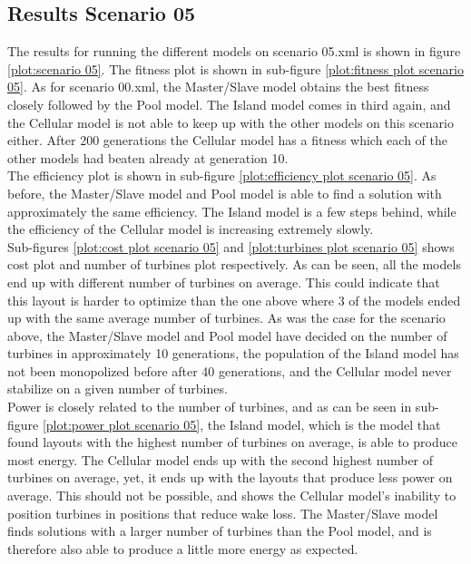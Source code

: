 \subsection{Results Scenario 05}
The results for running the different models on scenario 05.xml is shown in figure \ref{plot:scenario 05}. The fitness plot is shown in sub-figure \ref{plot:fitness plot scenario 05}. As for scenario 00.xml, the Master/Slave model obtains the best fitness closely followed by the Pool model. The Island model comes in third again, and the Cellular model is not able to keep up with the other models on this scenario either. After 200 generations the Cellular model has a fitness which each of the other models had beaten already at generation 10.\\

\noindent The efficiency plot is shown in sub-figure \ref{plot:efficiency plot scenario 05}. As before, the Master/Slave model and Pool model is able to find a solution with approximately the same efficiency. The Island model is a few steps behind, while the efficiency of the Cellular model is increasing extremely slowly. \\

\noindent Sub-figures \ref{plot:cost plot scenario 05} and \ref{plot:turbines plot scenario 05} shows cost plot and number of turbines plot respectively. As can be seen, all the models end up with different number of turbines on average. This could indicate that this layout is harder to optimize than the one above where 3 of the models ended up with the same average number of turbines. As was the case for the scenario above, the Master/Slave model and Pool model have decided on the number of turbines in approximately 10 generations, the population of the Island model has not been monopolized before after 40 generations, and the Cellular model never stabilize on a given number of turbines.\\

\noindent Power is closely related to the number of turbines, and as can be seen in sub-figure \ref{plot:power plot scenario 05}, the Island model, which is the model that found layouts with the highest number of turbines on average, is able to produce most energy. The Cellular model ends up with the second highest number of turbines on average, yet, it ends up with the layouts that produce less power on average. This should not be possible, and shows the Cellular model's inability to position turbines in positions that reduce wake loss. The Master/Slave model finds solutions with a larger number of turbines than the Pool model, and is therefore also able to produce a little more energy as expected.\\

